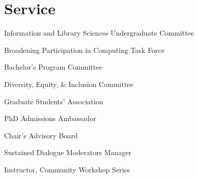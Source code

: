 \documentclass[10pt, letterpaper]{article}
\begin{document}
\section{Service}

\noindent{}\vspace{3pt}

\noindent {}\hspace{5pt} Information and Library Sciences Undergraduate Committee \par
\vspace{5pt}

\noindent{}\vspace{3pt}

\noindent {}\hspace{5pt} Broadening Participation in Computing Task Force \par
\noindent {}\hspace{5pt} Bachelor's Program Committee \par
\noindent {}\hspace{5pt} Diversity, Equity, \& Inclusion Committee \par
\noindent {}\hspace{5pt} Graduate Students' Association \par
\noindent {}\hspace{5pt} PhD Admissions Ambassador \par
\noindent {}\hspace{5pt} Chair's Advisory Board \par
\noindent {}\hspace{5pt} Sustained Dialogue Moderators Manager \par

\vspace{5pt}
\noindent{}\vspace{3pt}

\noindent {}\hspace{5pt} Instructor, Community Workshop Series \par
\vspace{5pt}
\end{document}
